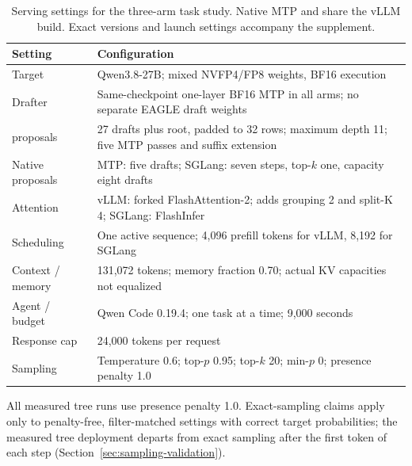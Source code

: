 \begin{table}[!htbp]
\caption{Serving settings for the three-arm task study. Native MTP and \sys{} share the vLLM build. Exact versions and launch settings accompany the supplement.}
\label{tab:serving-config}
\centering\footnotesize
\renewcommand{\arraystretch}{1.12}
\begin{tabularx}{\columnwidth}{@{}>{\raggedright\arraybackslash}p{}Y@{}}
\toprule
Setting & Configuration \\
\midrule
Target & Qwen3.8-27B; mixed NVFP4/FP8 weights, BF16 execution \\
Drafter & Same-checkpoint one-layer BF16 MTP in all arms; no separate EAGLE draft weights \\
\sys{} proposals & 27 drafts plus root, padded to 32 rows; maximum depth 11; five MTP passes and suffix extension \\
Native proposals & MTP: five drafts; SGLang: seven steps, top-$k$ one, capacity eight drafts \\
Attention & vLLM: forked FlashAttention-2; \sys{} adds grouping 2 and split-K 4; SGLang: FlashInfer \\
Scheduling & One active sequence; 4,096 prefill tokens for vLLM, 8,192 for SGLang \\
Context / memory & 131,072 tokens; memory fraction 0.70; actual KV capacities not equalized \\
Agent / budget & Qwen Code 0.19.4; one task at a time; 9,000 seconds \\
Response cap & 24,000 tokens per request \\
Sampling & Temperature 0.6; top-$p$ 0.95; top-$k$ 20; min-$p$ 0; presence penalty 1.0 \\
\bottomrule
\end{tabularx}
\end{table}

All measured tree runs use presence penalty 1.0. Exact-sampling claims apply only to penalty-free, filter-matched settings with correct target probabilities; the measured tree deployment departs from exact sampling after the first token of each step (Section~\ref{sec:sampling-validation}).
